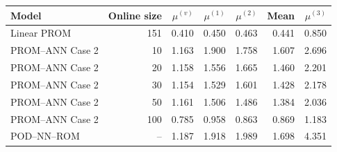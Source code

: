 \begin{tabular}{lr|rrrr|r}
\toprule
Model & Online size & $\mu^{(v)}$ & $\mu^{(1)}$ & $\mu^{(2)}$ & Mean & $\mu^{(3)}$ \\
\midrule
Linear PROM & 151 & 0.410 & 0.450 & 0.463 & 0.441 & 0.850 \\
PROM--ANN Case 2 & 10 & 1.163 & 1.900 & 1.758 & 1.607 & 2.696 \\
PROM--ANN Case 2 & 20 & 1.158 & 1.556 & 1.665 & 1.460 & 2.201 \\
PROM--ANN Case 2 & 30 & 1.154 & 1.529 & 1.601 & 1.428 & 2.178 \\
PROM--ANN Case 2 & 50 & 1.161 & 1.506 & 1.486 & 1.384 & 2.036 \\
PROM--ANN Case 2 & 100 & 0.785 & 0.958 & 0.863 & 0.869 & 1.183 \\
\midrule
POD--NN--ROM & -- & 1.187 & 1.918 & 1.989 & 1.698 & 4.351 \\
\bottomrule
\end{tabular}
